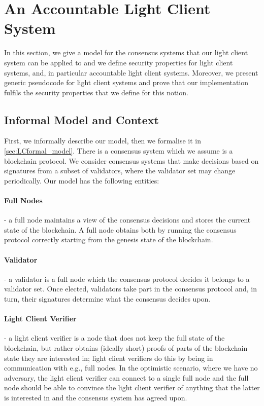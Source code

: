 \section{An Accountable Light Client System}
\label{sec_light_client_model}
\label{new_light_client}

In this section, we give a model for the consensus systems that our light client system can be applied to and we define security properties for light client systems,
and, in particular accountable light client systems. Moreover, we present generic pseudocode for light client systems and prove that our implementation 
fulfils the security properties that we define for this notion.  

\subsection{Informal Model and Context}
\label{sec:LCinformal_model}

First, we informally describe our model, then we formalise it in \ref{sec:LCformal_model}.
There is a consensus system which we assume is a blockchain protocol. 
We consider consensus systems that make decisions based on signatures from a subset of validators, where the validator set may change periodically. 
Our model has the following entities: 

\paragraph{Full Nodes} - a full node maintains a view of the consensus decisions and stores the current state of the blockchain. 
A full node obtains both by running the consensus protocol correctly starting from the genesis state of the blockchain.

\paragraph{Validator} - a validator is a full node which the consensus protocol decides it belongs to a validator set. Once elected, 
validators take part in the consensus protocol and, in turn, their signatures determine what the consensus decides upon. 

\paragraph{Light Client Verifier} - a light client verifier is a node that does not keep the full state of the blockchain, but rather obtains (ideally short) proofs 
of parts of the blockchain state they are interested in; light client verifiers do this by being in communication with e.g., full nodes. In the optimistic scenario, 
where we have no adversary, the light client verifier can connect to a single full node and the full node should be able to convince the light client verifier of 
anything that the latter is interested in and the consensus system has agreed upon.

